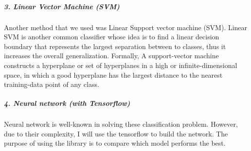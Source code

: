 \documentclass[12pt,english,]{article}
\let\oldsubparagraph\subparagraph
\renewcommand{\subparagraph}[1]{\oldsubparagraph{#1}\mbox{}}
\begin{document}
\hypertarget{linear-vector-machine-svm}{%
\subparagraph{3. Linear Vector Machine
(SVM)}\label{linear-vector-machine-svm}}

Another method that we used was Linear Support vector machine (SVM).
Linear SVM is another common classifier whose idea is to find a linear
decision boundary that represents the largest separation between to
classes, thus it increases the overall generalization. Formally, A
support-vector machine constructs a hyperplane or set of hyperplanes in
a high or infinite-dimensional space, in which a good hyperplane has the
largest distance to the nearest training-data point of any class.

\hypertarget{neural-network-with-tensorflow}{%
\subparagraph{4. Neural network (with
Tensorflow)}\label{neural-network-with-tensorflow}}

Neural network is well-known in solving these classification problem.
However, due to their complexity, I will use the tensorflow to build the
network. The purpose of using the library is to compare which model
performs the best.
\end{document}
